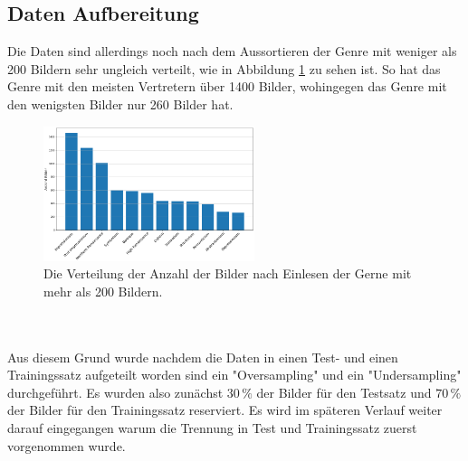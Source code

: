 \subsection{Daten Aufbereitung}
Die Daten sind allerdings noch nach dem Aussortieren der Genre mit weniger als 200 Bildern sehr ungleich verteilt, wie in Abbildung \ref{fig:verteilung_daten} zu sehen ist.
So hat das Genre mit den meisten Vertretern über 1400 Bilder, wohingegen das Genre mit den wenigsten Bilder nur 260 Bilder hat.
\begin{figure}
    \centering
    \includegraphics[width=0.55\textwidth]{content/data/Verteilung_Daten_Preprocessesing.PNG}
    \caption{Die Verteilung der Anzahl der Bilder nach Einlesen der Gerne mit mehr als 200 Bildern.}
    \label{fig:verteilung_daten}
\end{figure}
\\\\
Aus diesem Grund wurde nachdem die Daten in einen Test- und einen Trainingssatz aufgeteilt worden sind ein "Oversampling" und ein "Undersampling" durchgeführt.
Es wurden also zunächst $30\, \%$ der Bilder für den Testsatz und $70\, \%$ der Bilder für den Trainingssatz reserviert.
Es wird im späteren Verlauf weiter darauf eingegangen warum die Trennung in Test und Trainingssatz zuerst vorgenommen wurde.
\\\\
